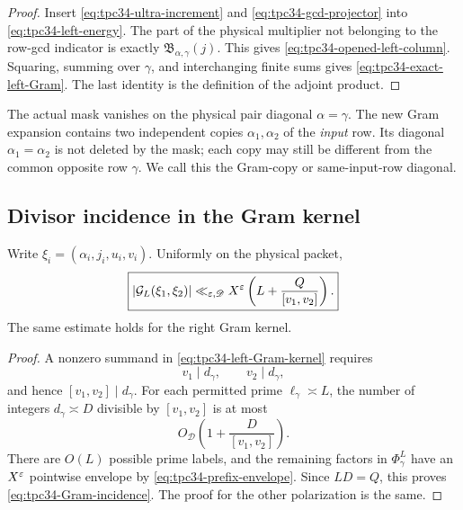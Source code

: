 \begin{proof}
Insert \eqref{eq:tpc34-ultra-increment} and
\eqref{eq:tpc34-gcd-projector} into
\eqref{eq:tpc34-left-energy}.  The part of the physical multiplier not
belonging to the row-gcd indicator is exactly
\(\mathfrak B_{\alpha,\gamma}(j)\).  This gives
\eqref{eq:tpc34-opened-left-column}.  Squaring, summing over \(\gamma\),
and interchanging finite sums gives
\eqref{eq:tpc34-exact-left-Gram}.  The last identity is the definition of
the adjoint product.
\end{proof}

\begin{remark}
\label{rem:tpc34-two-diagonals}
The actual mask vanishes on the physical pair diagonal \(\alpha=\gamma\).
The new Gram expansion contains two independent copies
\(\alpha_1,\alpha_2\) of the \emph{input} row.  Its diagonal
\(\alpha_1=\alpha_2\) is not deleted by the mask; each copy may still be
different from the common opposite row \(\gamma\).  We call this the
Gram-copy or same-input-row diagonal.
\end{remark}

\subsection{Divisor incidence in the Gram kernel}

\begin{proposition}
\label{prop:tpc34-Gram-incidence}
Write \(\xi_i=(\alpha_i,j_i,u_i,v_i)\).  Uniformly on the physical packet,
\begin{equation}
 \boxed{
 |\mathcal G_L(\xi_1,\xi_2)|
 \ll_{\varepsilon,\mathscr D}
 X^\varepsilon\left(L+\frac{Q}{[v_1,v_2]}\right).}
 \label{eq:tpc34-Gram-incidence}
\end{equation}
The same estimate holds for the right Gram kernel.
\end{proposition}

\begin{proof}
A nonzero summand in \eqref{eq:tpc34-left-Gram-kernel} requires
\[
 v_1\mid d_\gamma,\qquad v_2\mid d_\gamma,
\]
and hence \([v_1,v_2]\mid d_\gamma\).  For each permitted prime
\(\ell_\gamma\asymp L\), the number of integers
\(d_\gamma\asymp D\) divisible by \([v_1,v_2]\) is at most
\[
 O_{\mathscr D}\!\left(1+\frac{D}{[v_1,v_2]}\right).
\]
There are \(O(L)\) possible prime labels, and the remaining factors in
\(\Phi_\gamma^L\) have an \(X^\varepsilon\) pointwise envelope by
\eqref{eq:tpc34-prefix-envelope}.  Since \(LD=Q\), this proves
\eqref{eq:tpc34-Gram-incidence}.  The proof for the other polarization is
the same.
\end{proof}

